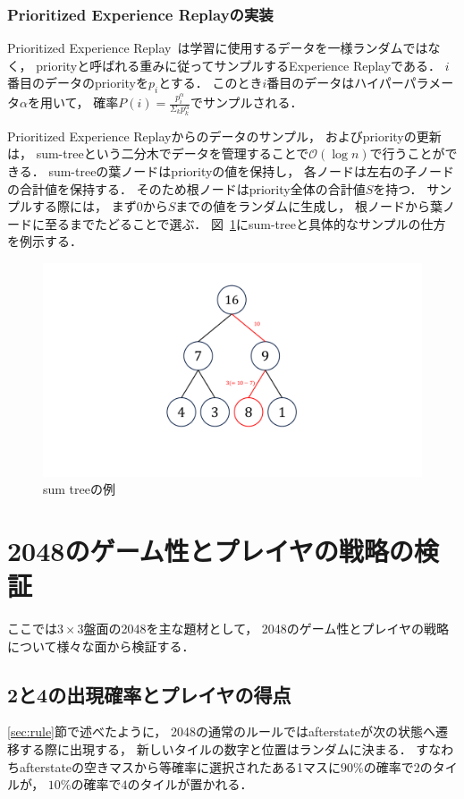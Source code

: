 \subsection{Prioritized Experience Replayの実装}
Prioritized Experience Replay~\cite{prioritized}は学習に使用するデータを一様ランダムではなく， priorityと呼ばれる重みに従ってサンプルするExperience Replayである．
$i$番目のデータのpriorityを$p_i$とする．
このとき$i$番目のデータはハイパーパラメータ$\alpha$を用いて， 確率$P(i) = \frac{p_{i}^{\alpha}}{\Sigma_k p_{k}^{\alpha}}$でサンプルされる．

Prioritized Experience Replayからのデータのサンプル， およびpriorityの更新は， sum-treeという二分木でデータを管理することで$\mathcal{O}(\log n)$で行うことができる．
sum-treeの葉ノードはpriorityの値を保持し， 各ノードは左右の子ノードの合計値を保持する．
そのため根ノードはpriority全体の合計値$S$を持つ．
サンプルする際には， まず$0$から$S$までの値をランダムに生成し， 根ノードから葉ノードに至るまでたどることで選ぶ．
図~\ref{fig:sumtree}にsum-treeと具体的なサンプルの仕方を例示する．
\begin{figure}[t]
    \centering
    \includegraphics[width=0.4\linewidth{}]{figures/sumtree_.pdf}
    \caption{sum treeの例}
    \label{fig:sumtree}
\end{figure}

\chapter{2048のゲーム性とプレイヤの戦略の検証}
ここでは$3\times3$盤面の2048を主な題材として， 2048のゲーム性とプレイヤの戦略について様々な面から検証する．

\section{2と4の出現確率とプレイヤの得点}
\ref{sec:rule}節で述べたように， 2048の通常のルールではafterstateが次の状態へ遷移する際に出現する， 新しいタイルの数字と位置はランダムに決まる．
すなわちafterstateの空きマスから等確率に選択されたある1マスに$90\%$の確率で$2$のタイルが， $10\%$の確率で$4$のタイルが置かれる．

